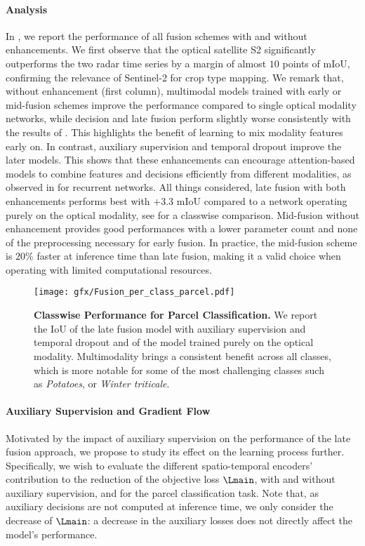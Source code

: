\paragraph{\bf Analysis}
In , we report the performance of all fusion schemes with and without  enhancements.
We first observe that the optical satellite S2 significantly outperforms the two radar time series by a margin of almost $10$ points of mIoU, confirming the relevance of Sentinel-2 for crop type mapping.
We remark that, without enhancement (first column), multimodal models trained with early or mid-fusion schemes improve the performance {compared to} single optical modality network{s}, {while} decision and late fusion perform slightly worse consistently with the results of \citet{pelletier2021fusion}. This highlights the benefit of learning {to mix} modality features early on. 
In contrast, auxiliary supervision and temporal dropout improve the later models. This shows that these enhancements can encourage attention-based models to combine features and decisions efficiently from different modalities, as observed in \citet{ienco2019combining} for recurrent networks. 
All things considered, late fusion with both enhancements performs best with $+3.3$ mIoU compared to  {a network operating purely on the optical modality}, see  for {a classwise comparison}. {Mid-}fusion without enhancement provides good performances with a lower parameter count and none of the preprocessing necessary for early fusion. In practice, the {mid-fusion scheme} is $20$\% faster at inference time than late fusion, making it a valid choice when operating with limited computational resources.

\begin{figure}
    \centering
    \texttt{[image: gfx/Fusion\_per\_class\_parcel.pdf]}
    \caption{{\bf Classwise Performance for Parcel Classification.} We report the IoU of the late fusion model with auxiliary supervision and temporal dropout and {of} the model traine{d} purely on the optical modality. {Multimodality brings a consistent benefit across all classes, which is more notable for some of the most challenging classes such as \emph{Potatoes}, or \emph{Winter triticale}.}}
    \label{fig:perclass_parcel}
\end{figure} 
\paragraph{\bf Auxiliary Supervision and Gradient Flow}
Motivated by the impact of auxiliary supervision on the performance of the late fusion approach, we propose to study its effect on the learning process further.  
Specifically, we wish to evaluate the different spatio-temporal encoders' contribution to the reduction of the objective loss $\Lmain$, with and without auxiliary supervision, and for the parcel classification task.
Note that, as auxiliary decisions are not computed at inference time, we only consider the decrease of $\Lmain$: a decrease in the auxiliary losses does not directly affect the model's performance.


